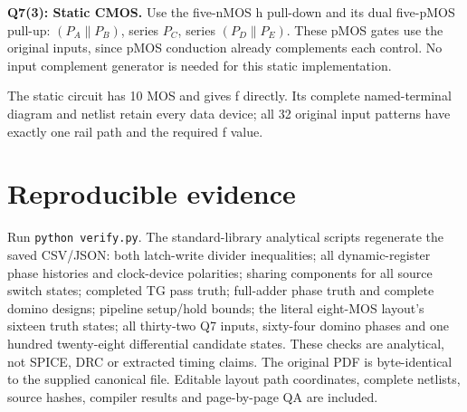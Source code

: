 \documentclass[10pt]{article}
\newcommand{\mos}[4]{\begin{scope}[shift={(#1,#2)}]
\draw(0,.24)--(0,-.24);\draw(0,.2)--(.25,.2)--(.25,.5);\draw(0,-.2)--(.25,-.2)--(.25,-.5);
\draw(-.16,.23)--(-.16,-.23);
\ifnum#4=1\draw(-.26,0)circle(.06);\draw(-.75,0)--(-.32,0);\else\draw(-.75,0)--(-.16,0);\fi
\node[anchor=east,font=\scriptsize]at(-.76,0){$#3$};\end{scope}}
\begin{document}
\textbf{Q7(3): Static CMOS.} Use the five-nMOS h pull-down and its dual five-pMOS pull-up: $(P_A\parallel P_B)$, series $P_C$, series $(P_D\parallel P_E)$. These pMOS gates use the original inputs, since pMOS conduction already complements each control. No input complement generator is needed for this static implementation.
\begin{center}\end{center}
The static circuit has 10 MOS and gives f directly. Its complete named-terminal diagram and netlist retain every data device; all 32 original input patterns have exactly one rail path and the required f value.

\section*{Reproducible evidence}
Run \texttt{python verify.py}. The standard-library analytical scripts regenerate the saved CSV/JSON: both latch-write divider inequalities; all dynamic-register phase histories and clock-device polarities; sharing components for all source switch states; completed TG pass truth; full-adder phase truth and complete domino designs; pipeline setup/hold bounds; the literal eight-MOS layout's sixteen truth states; all thirty-two Q7 inputs, sixty-four domino phases and one hundred twenty-eight differential candidate states. These checks are analytical, not SPICE, DRC or extracted timing claims. The original PDF is byte-identical to the supplied canonical file. Editable layout path coordinates, complete netlists, source hashes, compiler results and page-by-page QA are included.
\end{document}
